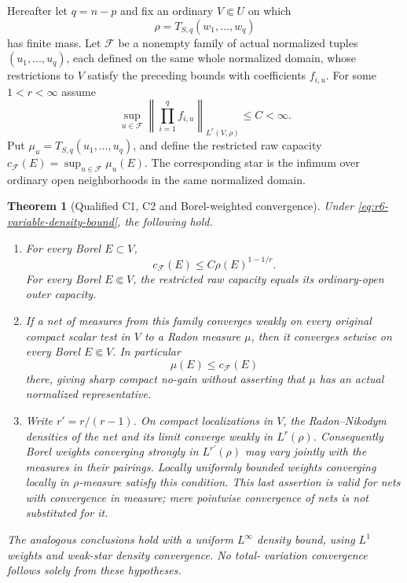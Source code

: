 \documentclass[11pt,a4paper]{article}
\numberwithin{equation}{section}
\newtheorem{theorem}{Theorem}[section]
\theoremstyle{definition}
\theoremstyle{remark}
\begin{document}
Hereafter let $q=n-p$ and fix an ordinary $V\Subset U$ on which
\[
                          \rho=T_{S,q}(w_1,\ldots,w_q)
\]
has finite mass. Let $\mathscr F$ be a nonempty family of actual
normalized tuples $(u_1,\ldots,u_q)$, each defined on the same whole
normalized domain, whose restrictions to $V$ satisfy the preceding
bounds with coefficients $f_{i,u}$. For some $1<r<\infty$ assume
\begin{equation}
 \sup_{u\in\mathscr F}
      \left\|\prod_{i=1}^qf_{i,u}\right\|_{L^r(V,\rho)}\le C<\infty.
 \label{eq:r6-variable-density-bound}
\end{equation}
Put $\mu_u=T_{S,q}(u_1,\ldots,u_q)$, and define the restricted raw
capacity $c_{\mathscr F}(E)=\sup_{u\in\mathscr F}\mu_u(E)$.
The corresponding star is the infimum over ordinary open neighborhoods
in the same normalized domain.

\begin{theorem}[Qualified C1, C2 and Borel-weighted convergence]
\label{thm:r6-integrable-density-capacity-stability}
Under \eqref{eq:r6-variable-density-bound}, the following hold.
\begin{enumerate}
\item For every Borel $E\subset V$,
\[
                    c_{\mathscr F}(E)
                               \le C\rho(E)^{1-1/r}.
\]
For every Borel $E\Subset V$, the restricted raw capacity equals
its ordinary-open outer capacity.
\item If a net of measures from this family converges weakly on every
original compact scalar test in $V$ to a Radon measure $\mu$, then
it converges setwise on every Borel $E\Subset V$. In particular
\[
                       \mu(E)\le c_{\mathscr F}(E)
\]
there, giving sharp compact no-gain without asserting that $\mu$ has
an actual normalized representative.
\item Write $r'=r/(r-1)$. On compact localizations in $V$, the
Radon--Nikodym densities of the net and its limit converge weakly
in $L^r(\rho)$. Consequently Borel weights converging strongly in
$L^{r'}(\rho)$ may vary jointly with the measures in their pairings.
Locally uniformly bounded weights converging locally in $\rho$-measure
satisfy this condition. This last assertion is valid for nets with
convergence in measure; mere pointwise convergence of nets is not
substituted for it.
\end{enumerate}
The analogous conclusions hold with a uniform $L^\infty$ density
bound, using $L^1$ weights and weak-star density convergence. No total-
variation convergence follows solely from these hypotheses.
\end{theorem}
\end{document}
